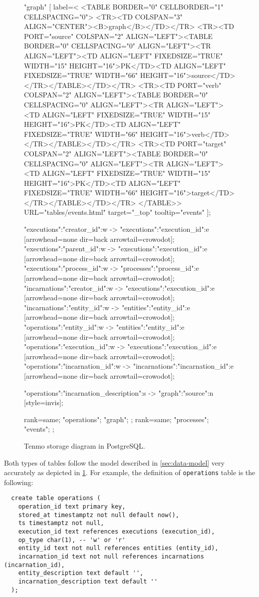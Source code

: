 \begin{figure}[t]
{  "graph" [
   label=<
    <TABLE BORDER="0" CELLBORDER="1" CELLSPACING="0">
      <TR><TD COLSPAN="3" ALIGN="CENTER"><B>graph</B></TD></TR>
      <TR><TD PORT="source" COLSPAN="2" ALIGN="LEFT"><TABLE BORDER="0" CELLSPACING="0" ALIGN="LEFT"><TR ALIGN="LEFT"><TD ALIGN="LEFT" FIXEDSIZE="TRUE" WIDTH="15" HEIGHT="16">PK</TD><TD ALIGN="LEFT" FIXEDSIZE="TRUE" WIDTH="66" HEIGHT="16">source</TD></TR></TABLE></TD></TR>
      <TR><TD PORT="verb" COLSPAN="2" ALIGN="LEFT"><TABLE BORDER="0" CELLSPACING="0" ALIGN="LEFT"><TR ALIGN="LEFT"><TD ALIGN="LEFT" FIXEDSIZE="TRUE" WIDTH="15" HEIGHT="16">PK</TD><TD ALIGN="LEFT" FIXEDSIZE="TRUE" WIDTH="66" HEIGHT="16">verb</TD></TR></TABLE></TD></TR>
      <TR><TD PORT="target" COLSPAN="2" ALIGN="LEFT"><TABLE BORDER="0" CELLSPACING="0" ALIGN="LEFT"><TR ALIGN="LEFT"><TD ALIGN="LEFT" FIXEDSIZE="TRUE" WIDTH="15" HEIGHT="16">PK</TD><TD ALIGN="LEFT" FIXEDSIZE="TRUE" WIDTH="66" HEIGHT="16">target</TD></TR></TABLE></TD></TR>
    </TABLE>>
    URL="tables/events.html"
    target="_top"
    tooltip="events"
  ];
    
  "executions":"creator_id":w -> "executions":"execution_id":e [arrowhead=none dir=back arrowtail=crowodot];
  "executions":"parent_id":w -> "executions":"execution_id":e [arrowhead=none dir=back arrowtail=crowodot];
  "executions":"process_id":w -> "processes":"process_id":e [arrowhead=none dir=back arrowtail=crowodot];
  "incarnations":"creator_id":w -> "executions":"execution_id":e [arrowhead=none dir=back arrowtail=crowodot];
  "incarnations":"entity_id":w -> "entities":"entity_id":e [arrowhead=none dir=back arrowtail=crowodot];
  "operations":"entity_id":w -> "entities":"entity_id":e [arrowhead=none dir=back arrowtail=crowodot];
  "operations":"execution_id":w -> "executions":"execution_id":e [arrowhead=none dir=back arrowtail=crowodot];
  "operations":"incarnation_id":w -> "incarnations":"incarnation_id":e [arrowhead=none dir=back arrowtail=crowodot];

  "operations":"incarnation_description":s -> "graph":"source":n [style=invis];

  { rank=same; "operations"; "graph"; };
  { rank=same; "processes"; "events"; };
}
    \caption{Tenmo storage diagram in PostgreSQL.}
    \label{fig:storage-diagram}
\end{figure}
 
Both types of tables follow the model described in \cref{sec:data-model} very accurately as depicted in \cref{fig:storage-diagram}. For example, the definition of \texttt{operations} table is the following:
\begin{verbatim}
  create table operations (
    operation_id text primary key,
    stored_at timestamptz not null default now(),
    ts timestamptz not null,
    execution_id text references executions (execution_id),
    op_type char(1), -- 'w' or 'r'
    entity_id text not null references entities (entity_id),
    incarnation_id text not null references incarnations (incarnation_id),
    entity_description text default '',
    incarnation_description text default ''
  );
\end{verbatim}

